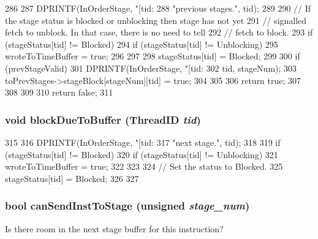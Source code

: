 \begin{DoxyCode}
286 {
287     DPRINTF(InOrderStage, "[tid:%
288             "previous stages.\n", tid);
289 
290     // If the stage status is blocked or unblocking then stage has not yet
291     // signalled fetch to unblock. In that case, there is no need to tell
292     // fetch to block.
293     if (stageStatus[tid] != Blocked) {
294         if (stageStatus[tid] != Unblocking) {
295             wroteToTimeBuffer = true;
296         }
297 
298         stageStatus[tid] = Blocked;
299 
300         if (prevStageValid) {
301             DPRINTF(InOrderStage, "[tid:%
302                     tid, stageNum);
303             toPrevStages->stageBlock[stageNum][tid] = true;
304         }
305 
306         return true;
307     }
308 
309 
310     return false;
311 }
\end{DoxyCode}
\hypertarget{classPipelineStage_aee83987cebca092f91d7328291e7d40f}{
\subsubsection[{blockDueToBuffer}]{\setlength{\rightskip}{0pt plus 5cm}void blockDueToBuffer ({\bf ThreadID} {\em tid})}}
\label{classPipelineStage_aee83987cebca092f91d7328291e7d40f}



\begin{DoxyCode}
315 {
316     DPRINTF(InOrderStage, "[tid:%
317             "next stage.\n", tid);
318 
319     if (stageStatus[tid] != Blocked) {
320         if (stageStatus[tid] != Unblocking) {
321             wroteToTimeBuffer = true;
322         }
323 
324         // Set the status to Blocked.
325         stageStatus[tid] = Blocked;
326     }
327 }
\end{DoxyCode}
\hypertarget{classPipelineStage_a4666632f247a5d92380cb32d6e286c75}{
\subsubsection[{canSendInstToStage}]{\setlength{\rightskip}{0pt plus 5cm}bool canSendInstToStage (unsigned {\em stage\_\-num})}}
\label{classPipelineStage_a4666632f247a5d92380cb32d6e286c75}
Is there room in the next stage buffer for this instruction? 


